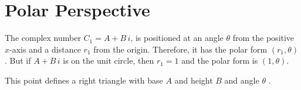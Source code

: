 \documentclass{ximera}
\begin{document}
\section*{Polar Perspective}



The complex number $C_1 = A + B \, i$, is positioned at an angle $\theta$ from the positive $x$-axis and a distance $r_1$ from the origin. Therefore, it has the polar form $(r_1, \theta)$. But if  $A + B \, i$ is on the unit circle, then $r_1 = 1$ and the polar form is $(1, \theta)$.




This point defines a right triangle with base $A$ and height $B$ and angle $\theta$ .  
\end{document}
